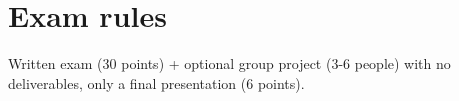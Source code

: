 \section*{Exam rules}

Written exam (30 points) + optional group project (3-6 people) with no deliverables, only a final presentation (6 points).
